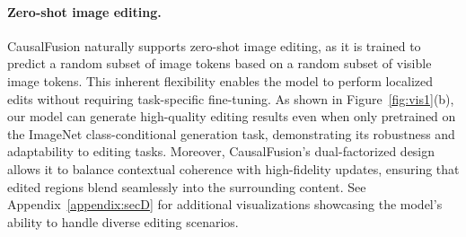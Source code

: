\begin{table}[h!]
\footnotesize
\centering
{}
\hfill
{}
\vspace{-5pt}
\caption{
(a) \textbf{Comparison with Transfusion}~\cite{transfusion} on perception and generation benchmarks. All models are trained under the same settings using the same pretraining data. (b) \textbf{Comparison with DiT}~\cite{dit} on perception and generation benchmarks. The model marked with $\dagger$ is trained with a VAE from \cite{mar}, using a loss function to predict latent variables rather than noise.
\vspace{-10pt}
}
\label{tab:multimodal}
\end{table}

\vspace{-5pt}
\paragraph{Zero-shot image editing.}
CausalFusion naturally supports zero-shot image editing, as it is trained to predict a random subset of image tokens based on a random subset of visible image tokens. This inherent flexibility enables the model to perform localized edits without requiring task-specific fine-tuning. As shown in Figure~\ref{fig:vis1}(b), our model can generate high-quality editing results even when only pretrained on the ImageNet class-conditional generation task, demonstrating its robustness and adaptability to editing tasks. Moreover, CausalFusion's dual-factorized design allows it to balance contextual coherence with high-fidelity updates, ensuring that edited regions blend seamlessly into the surrounding content. See Appendix~\ref{appendix:secD} for additional visualizations showcasing the model's ability to handle diverse editing scenarios.


